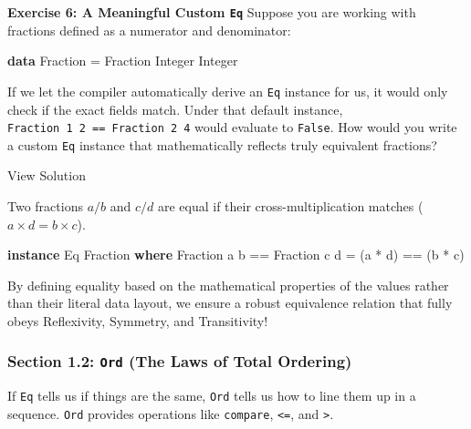 \documentclass[
]{article}
\newenvironment{Shaded}{}{}
\newcommand{\DataTypeTok}[1]{\textcolor[rgb]{0.56,0.13,0.00}{#1}}
\newcommand{\KeywordTok}[1]{\textcolor[rgb]{0.00,0.44,0.13}{\textbf{#1}}}
\newcommand{\NormalTok}[1]{#1}
\newcommand{\OperatorTok}[1]{\textcolor[rgb]{0.40,0.40,0.40}{#1}}
\newcommand{\OtherTok}[1]{\textcolor[rgb]{0.00,0.44,0.13}{#1}}
\begin{document}
\begin{itemize}
  \textbf{Exercise 6: A Meaningful Custom \texttt{Eq}} Suppose you are
  working with fractions defined as a numerator and denominator:

\begin{Shaded}
\begin{Highlighting}[]
\KeywordTok{data} \DataTypeTok{Fraction} \OtherTok{=} \DataTypeTok{Fraction} \DataTypeTok{Integer} \DataTypeTok{Integer}
\end{Highlighting}
\end{Shaded}

  If we let the compiler automatically derive an \texttt{Eq} instance
  for us, it would only check if the exact fields match. Under that
  default instance, \texttt{Fraction\ 1\ 2\ ==\ Fraction\ 2\ 4} would
  evaluate to \texttt{False}. How would you write a custom \texttt{Eq}
  instance that mathematically reflects truly equivalent fractions?

  View Solution

  Two fractions \(a/b\) and \(c/d\) are equal if their
  cross-multiplication matches (\(a \times d = b \times c\)).

\begin{Shaded}
\begin{Highlighting}[]
\KeywordTok{instance} \DataTypeTok{Eq} \DataTypeTok{Fraction} \KeywordTok{where}
    \DataTypeTok{Fraction}\NormalTok{ a b }\OperatorTok{==} \DataTypeTok{Fraction}\NormalTok{ c d }\OtherTok{=}\NormalTok{ (a }\OperatorTok{*}\NormalTok{ d) }\OperatorTok{==}\NormalTok{ (b }\OperatorTok{*}\NormalTok{ c)}
\end{Highlighting}
\end{Shaded}

  By defining equality based on the mathematical properties of the
  values rather than their literal data layout, we ensure a robust
  equivalence relation that fully obeys Reflexivity, Symmetry, and
  Transitivity!
\end{itemize}

\subsubsection{\texorpdfstring{Section 1.2: \texttt{Ord} (The Laws of
Total
Ordering)}{Section 1.2: Ord (The Laws of Total Ordering)}}\label{section-1.2-ord-the-laws-of-total-ordering}

If \texttt{Eq} tells us if things are the same, \texttt{Ord} tells us
how to line them up in a sequence. \texttt{Ord} provides operations like
\texttt{compare}, \texttt{\textless{}=}, and \texttt{\textgreater{}}.
\end{document}

